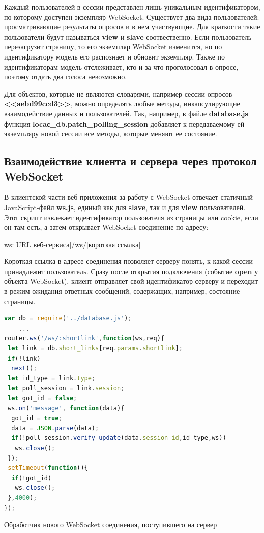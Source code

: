  Каждый пользователей в сессии представлен лишь уникальным идентификатором, по которому доступен экземпляр WebSocket. Существует два вида пользователей: просматривающие результаты опросов и в нем участвующие. Для краткости такие пользователи будут называться \textbf{view} и \textbf{slave} соотвественно. Если пользователь перезагрузит страницу, то его экземпляр WebSocket изменится, но по идентификатору модель его распознает и обновит экземпляр. Также по идентификаторам модель отслеживает, кто и за что проголосовал в опросе, поэтому отдать два голоса невозможно. 
 
 Для объектов, которые не являются словарями, например сессии опросов \textbf{<<aebd99ccd3>>}, можно определять любые методы, инкапсулирующие взаимодействие данных и пользователей. Так, например, в файле \textbf{database.js} функция \textbf{locaс\_db.patсh\_polling\_session} добавляет к передаваемому ей экземпляру новой сессии все методы, которые меняют ее состояние. 
 
\subsection{Взаимодействие клиента и сервера через протокол WebSocket}
В клиентской части веб-приложения за работу с WebSocket отвечает статичный JavaScript-файл \textbf{ws.js}, единый как для \textbf{slave}, так и для \textbf{view} пользователей. Этот скрипт извлекает идентификатор пользователя из страницы или cookie, если он там есть, а затем открывает WebSocket-соединение по адресу:     
 \begin{Verb}
 	ws:[URL веб-сервиса]/ws/[короткая ссылка]  
 \end{Verb}

Короткая ссылка в адресе соединения позволяет серверу понять, к какой сессии принадлежит пользователь. Сразу после открытия подключения (событие \textbf{open} у объекта WebSocket), клиент отправляет свой идентификатор серверу и переходит в режим ожидания ответных сообщений, содержащих, например, состояние страницы.

\begin{ListingEnv}[H]
	\begin{lstlisting}[language=JavaScript]
var db = require('../database.js');
	...
router.ws('/ws/:shortlink',function(ws,req){
 let link = db.short_links[req.params.shortlink];
 if(!link)
  next();
 let id_type = link.type;
 let poll_session = link.session;
 let got_id = false;
 ws.on('message', function(data){
  got_id = true;
  data = JSON.parse(data);
  if(!poll_session.verify_update(data.session_id,id_type,ws))
   ws.close();
 });
 setTimeout(function(){
  if(!got_id)
   ws.close();
 },4000);
});
\end{lstlisting}
\caption{Обработчик нового WebSocket соединения, поступившего на сервер}
\label{list:poll-ws}
\end{ListingEnv}

